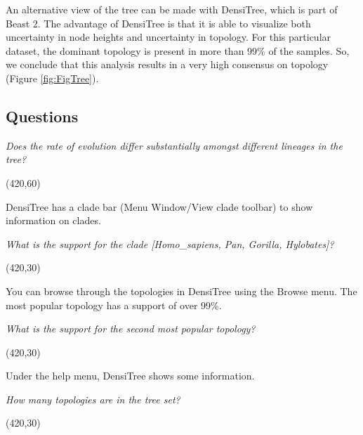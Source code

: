 \documentclass[11pt]{article}
\theoremstyle{plain}%
\theoremstyle{definition}
\theoremstyle{remark}
\begin{document}
An alternative view of the tree can be made with DensiTree, which is part of Beast 2. The advantage
of DensiTree is that it is able to visualize both uncertainty in node heights and uncertainty in topology.
For this particular dataset, the dominant topology is present in more than 99\% of the samples. So, 
we conclude that this analysis results in a very high consensus on topology (Figure \ref{fig:FigTree}).



\newpage
\subsection*{Questions}
\vspace{5 mm}

\textit{Does the rate of evolution differ substantially amongst different lineages in the tree?}

\vspace{5 mm}
\framebox(420,60){}
\vspace{5 mm}

DensiTree has a clade bar (Menu Window/View clade toolbar) to show information on clades.

\textit{What is the support for the clade [Homo\_sapiens, Pan, Gorilla, Hylobates]?}

\vspace{5 mm}
\framebox(420,30){}
\vspace{5 mm}

You can browse through the topologies in DensiTree using the Browse menu.
The most popular topology has a support of over 99\%.

\textit{What is the support for the second most popular topology?}

\vspace{5 mm}
\framebox(420,30){}
\vspace{5 mm}

Under the help menu, DensiTree shows some information.

\textit{How many topologies are in the tree set?}

\vspace{5 mm}
\framebox(420,30){}
\vspace{5 mm}
\newpage
\end{document}
